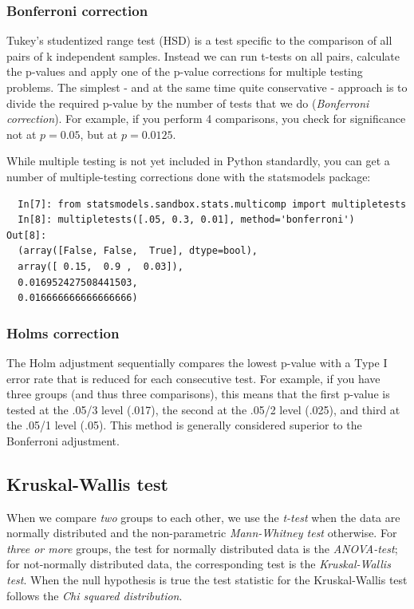 \subsubsection{Bonferroni correction}

Tukey's studentized range test (HSD) is a test specific to the comparison of all pairs of k independent samples. Instead we can run t-tests on all pairs, calculate the p-values and apply one of the p-value corrections for multiple testing problems. The simplest - and at the same time quite conservative - approach is to divide the required p-value by the number of tests that we do (\emph{Bonferroni correction}). For example, if you perform 4 comparisons, you check for significance not at $p=0.05$, but at $p=0.0125$.

While multiple testing is not yet included in Python standardly, you can get a number of multiple-testing corrections done with the statsmodels package:

\begin{lstlisting}
  In[7]: from statsmodels.sandbox.stats.multicomp import multipletests
  In[8]: multipletests([.05, 0.3, 0.01], method='bonferroni')
Out[8]:
  (array([False, False,  True], dtype=bool),
  array([ 0.15,  0.9 ,  0.03]),
  0.016952427508441503,
  0.016666666666666666)
\end{lstlisting}

\subsubsection{Holms correction}

The Holm adjustment sequentially compares the lowest p-value with a Type I error rate that is reduced for each consecutive test. For example, if you have three groups (and thus three comparisons), this means that the first p-value is tested at the .05/3 level (.017), the second at the .05/2 level (.025), and third at the .05/1 level (.05). This method is generally considered superior to the Bonferroni adjustment.

\subsection{Kruskal-Wallis test}\label{test:Kruskal-Wallis}

When we compare \emph{two} groups to each other, we use the \emph{t-test} when the data are normally distributed and the non-parametric \emph{Mann-Whitney test} otherwise. For \emph{three or more }groups, the test for normally distributed data is the \emph{ANOVA-test}; for not-normally distributed data, the corresponding test is the \emph{Kruskal-Wallis test}. When the null hypothesis is true the test statistic for the Kruskal-Wallis test follows the \emph{Chi squared distribution}.

